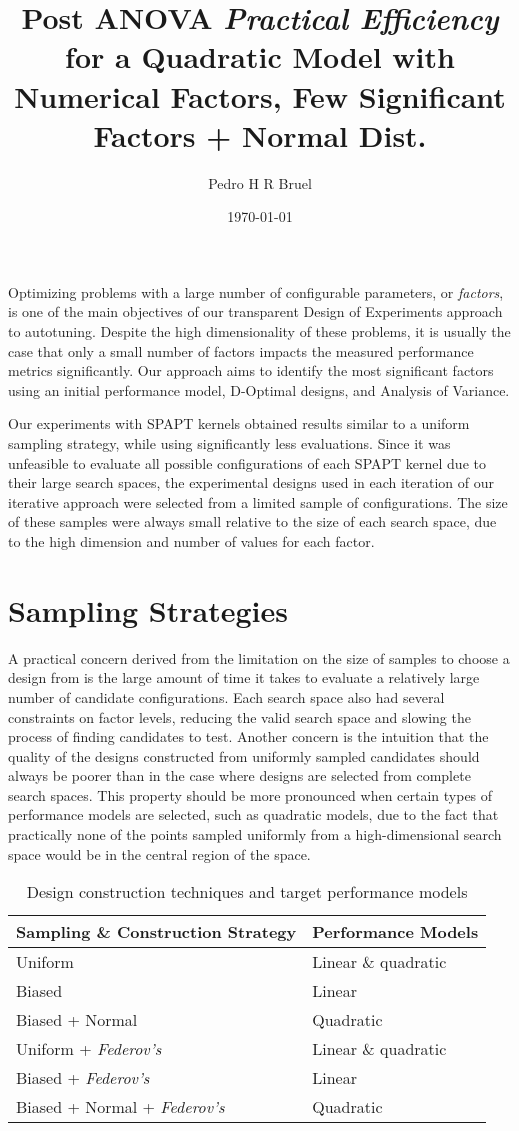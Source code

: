 \documentclass[11pt]{article}
\author{Pedro H R Bruel}
\date{\today}
\title{Post ANOVA \emph{Practical Efficiency} for a Quadratic Model with Numerical Factors, Few Significant Factors + Normal Dist.}
\begin{document}
\maketitle
Optimizing problems with a large number of configurable parameters, or
\emph{factors}, is one of the main objectives of our transparent Design of
Experiments approach to autotuning. Despite the high dimensionality of these
problems, it is usually the case that only a small number of
factors impacts the measured performance metrics significantly. Our approach
aims to identify the most significant factors using an initial performance
model, D-Optimal designs, and Analysis of Variance.

Our experiments with SPAPT kernels obtained results similar to a uniform
sampling strategy, while using significantly less evaluations. Since it was
unfeasible to evaluate all possible configurations of each SPAPT kernel due to
their large search spaces, the experimental designs used in each iteration of
our iterative approach were selected from a limited sample of configurations.
The size of these samples were always small relative to the size of each search
space, due to the high dimension and number of values for each factor.

\section{Sampling Strategies}
\label{sec:org38542fd}
A practical concern derived from the limitation on the size of samples to
choose a design from is the large amount of time it takes to evaluate a
relatively large number of candidate configurations. Each search space also had
several constraints on factor levels, reducing the valid search space and
slowing the process of finding candidates to test. Another concern is the
intuition that the  quality of the designs
constructed from uniformly sampled candidates should always be poorer than in
the case where designs are selected from complete search spaces. This property
should be more pronounced when certain types of performance models are selected,
such as quadratic models, due to the fact that practically none of the points
sampled uniformly from a high-dimensional search space would be in the central
region of the space.

\begin{table}[htbp]
\caption{\label{tab:org7cec80f}
Design construction techniques and target performance models}
\centering
\begin{tabular}{ll}
Sampling \& Construction Strategy & Performance Models\\
\hline
Uniform & Linear \& quadratic\\
Biased & Linear\\
Biased + Normal & Quadratic\\
Uniform + \emph{Federov's} & Linear \& quadratic\\
Biased + \emph{Federov's} & Linear\\
Biased + Normal + \emph{Federov's} & Quadratic\\
\end{tabular}
\end{table}
\end{document}
